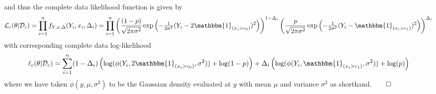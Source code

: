 \documentclass[10pt]{article}
\newcommand{\bp}[1]{\left({#1}\right)}
\newcommand{\1}[1]{\mathbbm{1}_{#1}}
\newcommand{\mc}[1]{\mathcal{#1}}
\begin{document}
and thus the complete data likelihood function is given by
\begin{align*}
    \mc{L}_c(\theta|\mc{D}_c)=\prod_{i=1}^nf_{Y,x,\Delta}(Y_i,x_i,\Delta_i)=\prod_{i=1}^n\bp{\frac{(1-p)}{\sqrt{2\pi\sigma^2}}\exp\bp{-\tfrac{1}{2\sigma^2}(Y_i-2\mathbbm{1}_{(x_i>c_0)})^2}}^{1-\Delta_i}\bp{\frac{p}{\sqrt{2\pi\sigma^2}}\exp\bp{-\tfrac{1}{2\sigma^2}(Y_i-\mathbbm{1}_{(x_i>c_1)})^2}}^{\Delta_i}
\end{align*}
with corresponding complete data log-likelihood
\begin{align*}
    \ell_c(\theta|\mc{D}_c)=\sum_{i=1}^n(1-\Delta_i)\bp{\log(\phi(Y_i,2\mathbbm{1}_{(x_i>c_0)},\sigma^2))+\log(1-p)}+\Delta_i\bp{\log(\phi(Y_i,\mathbbm{1}_{(x_i>c_1)},\sigma^2))+\log(p)}
\end{align*}
where we have taken $\phi(y,\mu,\sigma^2)$ to be the Gaussian density evaluated at $y$ with mean $\mu$ and variance $\sigma^2$ as shorthand.\hfill{$\qed$}
\end{document}
